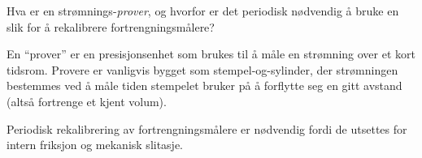 

Hva er en strømnings-\textit{prover}, og hvorfor er det periodisk nødvendig å bruke en slik for å rekalibrere fortrengningsmålere?







En ``prover'' er en presisjonsenhet som brukes til å måle en strømning over et kort tidsrom. Provere er vanligvis bygget som stempel-og-sylinder, der strømningen bestemmes ved å måle tiden stempelet bruker på å forflytte seg en gitt avstand (altså fortrenge et kjent volum).

Periodisk rekalibrering av fortrengningsmålere er nødvendig fordi de utsettes for intern friksjon og mekanisk slitasje.










